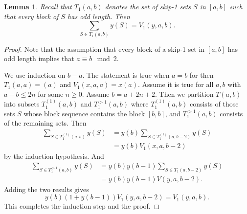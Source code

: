 \documentclass[11pt, oneside]{article}   	%
\newtheorem{lemma}{Lemma}
\begin{document}
\begin{lemma} \label{l V}
Recall that $T_1(a,b)$ denotes the set of skip-1 sets $S$ in $[a,b]$ such that every block of $S$ has odd length.   Then 
\[
\sum_{S \in T_1(a,b)} y(S) =  V_1(y,a,b). 
\]
\end{lemma}
\begin{proof} 
Note that the assumption that every block of a skip-1 set in $[a,b]$ has odd length implies that $a \equiv b \mod 2$.   


We use induction on $b-a$. The statement is true when $a=b$ for then $T_1(a,a) = (a)$ and $V_1(x,a,a) = x(a)$. Assume it is true for all $a,b$ with $a-b \leq 2n$ for some $n \geq 0$. Assume $b=a+2n+2$. Then we partition $T(a,b)$ into subsets $T_1^{(1)}(a,b)$ and $T_1^{>1}(a,b)$ where $T_1^{(1)}(a,b)$ consists of those sets $S$ whose block sequence contains the block $[b,b]$, and $T_1^{>1}(a,b)$ consists of the remaining sets. Then 
\begin{align*}
\sum_{S \in T_1^{(1)}(a,b)} y(S)  &= y(b)\sum_{S \in T_1^{(1)}(a,b-2)} y(S) \\ 
&= y(b) V_1(x,a,b-2)
\end{align*}
by the induction hypothesis. And 
\begin{align*}
\sum_{S \in T_1^{>1}(a,b)} y(S)  &= y(b)y(b-1)\sum_{S \in T_1(a,b-2)} y(S) \\ 
&= y(b) y(b-1)V(y,a,b-2).
\end{align*}
Adding the two results gives 
\[
y(b)(1+y(b-1))V_1(y,a,b-2) = V_1(y,a,b). 
\]
This completes the induction step and the proof. 
\end{proof}
\end{document}
